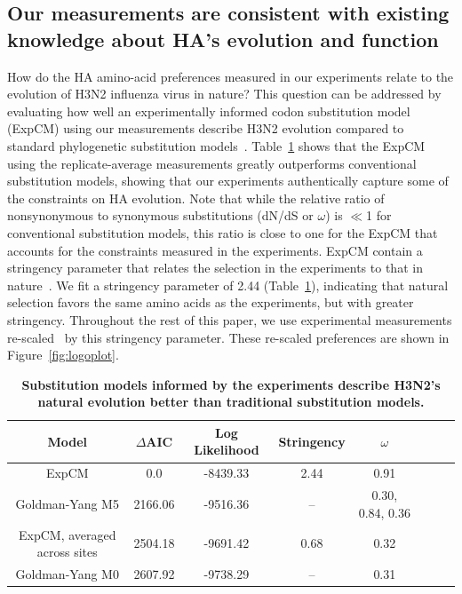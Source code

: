 \documentclass[9pt,twocolumn,twoside]{pnas-new}
\begin{document}
\subsection*{Our measurements are consistent with existing knowledge about HA's evolution and function}
How do the HA amino-acid preferences measured in our experiments relate to the evolution of H3N2 influenza virus in nature?
This question can be addressed by evaluating how well an experimentally informed codon substitution model (ExpCM) using our measurements describe H3N2 evolution compared to standard phylogenetic substitution models~\cite{bloom2017identification,hilton2017phydms}.
Table~\ref{tab:phydms} shows that the ExpCM using the replicate-average measurements greatly outperforms conventional substitution models, showing that our experiments authentically capture some of the constraints on HA evolution. 
Note that while the relative ratio of nonsynonymous to synonymous substitutions (dN/dS or $\omega$) is $\ll$1 for conventional substitution models, this ratio is close to one for the ExpCM that accounts for the constraints measured in the experiments.
ExpCM contain a stringency parameter that relates the selection in the experiments to that in nature~\cite{bloom2017identification,hilton2017phydms}.
We fit a stringency parameter of 2.44 (Table~\ref{tab:phydms}), indicating that natural selection favors the same amino acids as the experiments, but with greater stringency.
Throughout the rest of this paper, we use experimental measurements re-scaled~\cite{bloom2017identification,hilton2017phydms} by this stringency parameter.
These re-scaled preferences are shown in Figure~\ref{fig:logoplot}.

\begin{table}
\caption{\label{tab:phydms}
{\bf Substitution models informed by the experiments describe H3N2's natural evolution better than traditional substitution models.}}
\begin{center} 
\begin{tabular}{cccccccc}
\hline
\bf{Model} & \bf{$\Delta$AIC} & \bf{Log Likelihood} & \bf{Stringency} & \bf{$\omega$}  \\ \hline
ExpCM & 0.0 & -8439.33 & 2.44 & 0.91 \\
Goldman-Yang M5 & 2166.06 & -9516.36 & -- & 0.30, 0.84, 0.36 \\
ExpCM, averaged across sites & 2504.18 & -9691.42 & 0.68 & 0.32 \\
Goldman-Yang M0 & 2607.92 & -9738.29 & -- & 0.31 \\
\hline
\end{tabular}
 \end{center}
\end{table}
\end{document}
